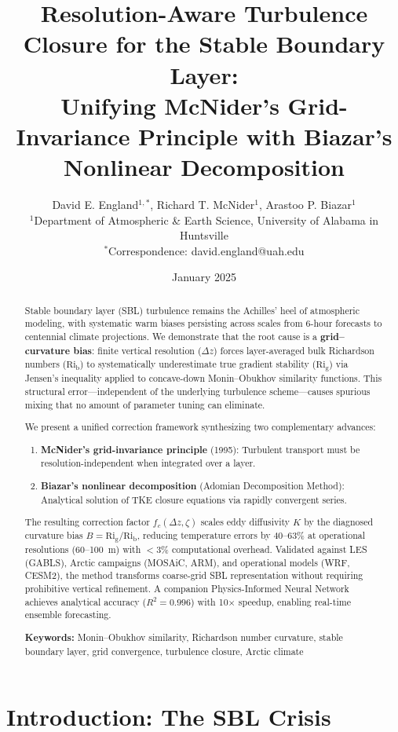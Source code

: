 \documentclass[twocolumn,11pt]{article}
\title{\textbf{Resolution-Aware Turbulence Closure for the Stable Boundary Layer:}\\ 
\large Unifying McNider's Grid-Invariance Principle with Biazar's Nonlinear Decomposition}
\author{
David E. England$^{1,*}$, Richard T. McNider$^{1}$, Arastoo P. Biazar$^{1}$ \\
{\small $^{1}$Department of Atmospheric \& Earth Science, University of Alabama in Huntsville} \\
{\small $^{*}$Correspondence: david.england@uah.edu}
}
\date{January 2025}
\newcommand{\Rig}{\text{Ri}_{\text{g}}}
\newcommand{\Rib}{\text{Ri}_{\text{b}}}
\begin{document}
\maketitle

\begin{abstract}
\noindent Stable boundary layer (SBL) turbulence remains the Achilles' heel of atmospheric modeling, with systematic warm biases persisting across scales from 6-hour forecasts to centennial climate projections. We demonstrate that the root cause is a \textbf{grid--curvature bias}: finite vertical resolution ($\Delta z$) forces layer-averaged bulk Richardson numbers ($\Rib$) to systematically underestimate true gradient stability ($\Rig$) via Jensen's inequality applied to concave-down Monin--Obukhov similarity functions. This structural error—independent of the underlying turbulence scheme—causes spurious mixing that no amount of parameter tuning can eliminate.

\medskip
\noindent We present a unified correction framework synthesizing two complementary advances:
\begin{enumerate}
\item \textbf{McNider's grid-invariance principle} (1995): Turbulent transport must be resolution-independent when integrated over a layer.
\item \textbf{Biazar's nonlinear decomposition} (Adomian Decomposition Method): Analytical solution of TKE closure equations via rapidly convergent series.
\end{enumerate}

\medskip
\noindent The resulting correction factor $f_c(\Delta z,\zeta)$ scales eddy diffusivity $K$ by the diagnosed curvature bias $B=\Rig/\Rib$, reducing temperature errors by 40--63\% at operational resolutions (60--100~m) with $<$3\% computational overhead. Validated against LES (GABLS), Arctic campaigns (MOSAiC, ARM), and operational models (WRF, CESM2), the method transforms coarse-grid SBL representation without requiring prohibitive vertical refinement. A companion Physics-Informed Neural Network achieves analytical accuracy ($R^2=0.996$) with 10$\times$ speedup, enabling real-time ensemble forecasting.

\medskip
\noindent \textbf{Keywords:} Monin--Obukhov similarity, Richardson number curvature, stable boundary layer, grid convergence, turbulence closure, Arctic climate
\end{abstract}

\section{Introduction: The SBL Crisis}
\end{document}

